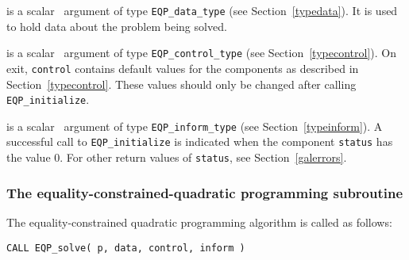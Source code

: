 \documentclass{galahad}
\newcommand{\packagename}{EQP}
\begin{document}
\begin{description}

 is a scalar \intentinout\ argument of type 
{\tt \packagename\_data\_type}
(see Section~\ref{typedata}). It is used to hold data about the problem being 
solved. 

 is a scalar \intentout\ argument of type 
{\tt \packagename\_control\_type}
(see Section~\ref{typecontrol}). 
On exit, {\tt control} contains default values for the components as
described in Section~\ref{typecontrol}.
These values should only be changed after calling 
{\tt \packagename\_initialize}.

 is a scalar \intentinout\ argument of type 
{\tt \packagename\_inform\_type}
(see Section~\ref{typeinform}). A successful call to
{\tt \packagename\_initialize}
is indicated when the  component {\tt status} has the value 0. 
For other return values of {\tt status}, see Section~\ref{galerrors}.

\end{description}


\subsubsection{The equality-constrained-quadratic programming subroutine}
The equality-constrained quadratic programming algorithm is called as follows:
\vspace*{1mm}

\hspace{8mm}
{\tt CALL \packagename\_solve( p, data, control, inform )}
\end{document}
